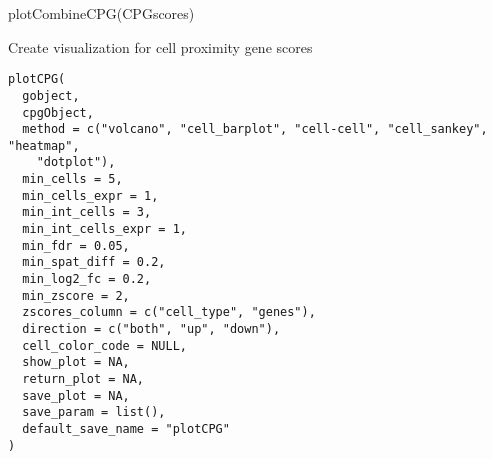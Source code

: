 \documentclass[a4paper]{book}
\begin{document}
%
\begin{Examples}
\begin{ExampleCode}
    plotCombineCPG(CPGscores)
\end{ExampleCode}
\end{Examples}
%
\begin{Description}\relax
Create visualization for cell proximity gene scores
\end{Description}
%
\begin{Usage}
\begin{verbatim}
plotCPG(
  gobject,
  cpgObject,
  method = c("volcano", "cell_barplot", "cell-cell", "cell_sankey", "heatmap",
    "dotplot"),
  min_cells = 5,
  min_cells_expr = 1,
  min_int_cells = 3,
  min_int_cells_expr = 1,
  min_fdr = 0.05,
  min_spat_diff = 0.2,
  min_log2_fc = 0.2,
  min_zscore = 2,
  zscores_column = c("cell_type", "genes"),
  direction = c("both", "up", "down"),
  cell_color_code = NULL,
  show_plot = NA,
  return_plot = NA,
  save_plot = NA,
  save_param = list(),
  default_save_name = "plotCPG"
)
\end{verbatim}
\end{Usage}
%
\end{document}
